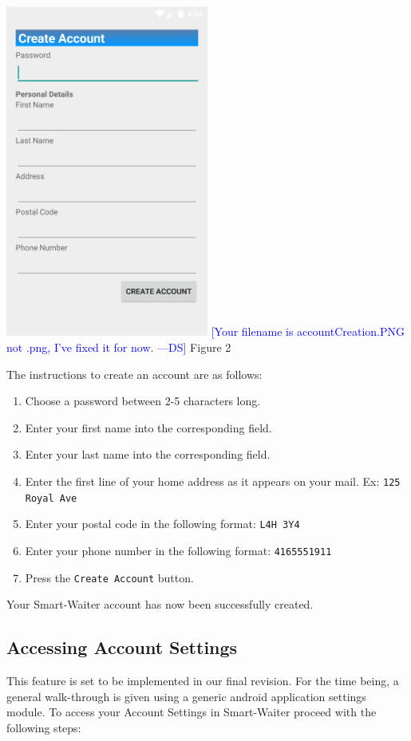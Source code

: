 \documentclass[12pt, titlepage]{article}
\newcommand{\authornote}[3]{\textcolor{#1}{[#3 ---#2]}}
\newcommand{\authornote}[3]{}
\newcommand{\ds}[1]{\authornote{blue}{DS}{#1}}
\begin{document}
\begin{center}
\includegraphics[width=0.5\textwidth]{accountCreation.PNG} 
	\ds{Your filename is accountCreation.PNG not .png, I've fixed it for now.}
\linebreak Figure 2 
\end{center}

The instructions to create an account are as follows: 
\begin{enumerate}
	\item Choose a password between 2-5 characters long.
	\item Enter your first name into the corresponding field.
	\item Enter your last name into the corresponding field.
	\item Enter the first line of your home address as it appears on your mail. Ex: \texttt{125 Royal Ave}
	\item Enter your postal code in the following format: \texttt{L4H 3Y4}
	\item Enter your phone number in the following format: \texttt{4165551911}
	\item Press the \texttt{Create Account} button.
\end{enumerate}

Your Smart-Waiter account has now been successfully created.
\subsection{Accessing Account Settings}
This feature is set to be implemented in our final revision. For the time being, a general walk-through is given using a generic android application settings module. To access your Account Settings in Smart-Waiter proceed with the following steps:
\end{document}
